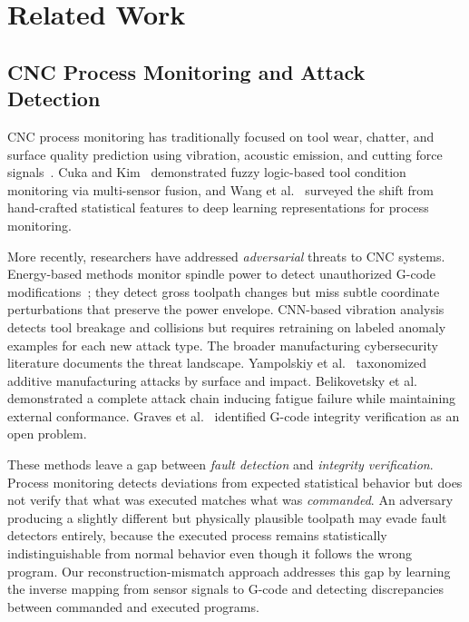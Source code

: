 \section{Related Work}
\label{sec:related_work}

\subsection{CNC Process Monitoring and Attack Detection}
\label{sec:rw_cnc_anomaly}

CNC process monitoring has traditionally focused on tool wear, chatter, and surface quality prediction using vibration, acoustic emission, and cutting force signals~\cite{teti2010advanced,dimla2000sensor}.
Cuka and Kim~\cite{cuka2022fuzzy} demonstrated fuzzy logic-based tool condition monitoring via multi-sensor fusion, and Wang et al.~\cite{wang2023deep} surveyed the shift from hand-crafted statistical features to deep learning representations for process monitoring.

More recently, researchers have addressed \emph{adversarial} threats to CNC systems.
Energy-based methods monitor spindle power to detect unauthorized G-code modifications~\cite{kimmell2025}; they detect gross toolpath changes but miss subtle coordinate perturbations that preserve the power envelope.
CNN-based vibration analysis~\cite{coelho2024} detects tool breakage and collisions but requires retraining on labeled anomaly examples for each new attack type.
The broader manufacturing cybersecurity literature documents the threat landscape.
Yampolskiy et al.~\cite{yampolskiy2018security} taxonomized additive manufacturing attacks by surface and impact.
Belikovetsky et al.~\cite{belikovetsky2017dr0wned} demonstrated a complete attack chain inducing fatigue failure while maintaining external conformance.
Graves et al.~\cite{graves2023cyberphysical} identified G-code integrity verification as an open problem.

These methods leave a gap between \emph{fault detection} and \emph{integrity verification}.
Process monitoring detects deviations from expected statistical behavior but does not verify that what was executed matches what was \emph{commanded}.
An adversary producing a slightly different but physically plausible toolpath may evade fault detectors entirely, because the executed process remains statistically indistinguishable from normal behavior even though it follows the wrong program.
Our reconstruction-mismatch approach addresses this gap by learning the inverse mapping from sensor signals to G-code and detecting discrepancies between commanded and executed programs.

